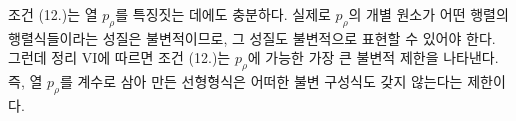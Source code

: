 
조건 (12.)는 열 $p_\rho$를 특징짓는 데에도 충분하다. 실제로 $p_\rho$의 개별 원소가 어떤 행렬의 행렬식들이라는 성질은 불변적이므로, 그 성질도 불변적으로 표현할 수 있어야 한다. 그런데 정리 VI에 따르면 조건 (12.)는 $p_\rho$에 가능한 가장 큰 불변적 제한을 나타낸다. 즉, 열 $p_\rho$를 계수로 삼아 만든 선형형식은 어떠한 불변 구성식도 갖지 않는다는 제한이다.
